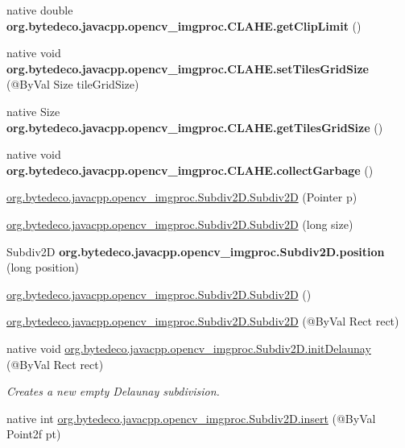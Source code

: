 \begin{DoxyCompactItemize}
native double {\bfseries org.\+bytedeco.\+javacpp.\+opencv\+\_\+imgproc.\+C\+L\+A\+H\+E.\+get\+Clip\+Limit} ()
\item 
\mbox{\label{group__imgproc_gac0c8c765edb4040e1def1ebc139de087}} 
native void {\bfseries org.\+bytedeco.\+javacpp.\+opencv\+\_\+imgproc.\+C\+L\+A\+H\+E.\+set\+Tiles\+Grid\+Size} (@By\+Val Size tile\+Grid\+Size)
\item 
\mbox{\label{group__imgproc_gae118ee734cd113613cd846a2513a7d35}} 
native Size {\bfseries org.\+bytedeco.\+javacpp.\+opencv\+\_\+imgproc.\+C\+L\+A\+H\+E.\+get\+Tiles\+Grid\+Size} ()
\item 
\mbox{\label{group__imgproc_ga5f07a495c61937e32ddabd7414000752}} 
native void {\bfseries org.\+bytedeco.\+javacpp.\+opencv\+\_\+imgproc.\+C\+L\+A\+H\+E.\+collect\+Garbage} ()
\item 
\hyperlink{group__imgproc_ga223915a9b07b19809dcae507f071bd73}{org.\+bytedeco.\+javacpp.\+opencv\+\_\+imgproc.\+Subdiv2\+D.\+Subdiv2D} (Pointer p)
\item 
\hyperlink{group__imgproc_ga3b06b65ff3cb26053cb1cea3a2dc3a0c}{org.\+bytedeco.\+javacpp.\+opencv\+\_\+imgproc.\+Subdiv2\+D.\+Subdiv2D} (long size)
\item 
\mbox{\label{group__imgproc_ga6581e20ac0802c75d91b12249f2ec7de}} 
Subdiv2D {\bfseries org.\+bytedeco.\+javacpp.\+opencv\+\_\+imgproc.\+Subdiv2\+D.\+position} (long position)
\item 
\hyperlink{group__imgproc_gae59447279a4317ac1ec79b5c0f3b8f4d}{org.\+bytedeco.\+javacpp.\+opencv\+\_\+imgproc.\+Subdiv2\+D.\+Subdiv2D} ()
\item 
\hyperlink{group__imgproc_ga07dbdb939b272f64ee69ec85f251b92d}{org.\+bytedeco.\+javacpp.\+opencv\+\_\+imgproc.\+Subdiv2\+D.\+Subdiv2D} (@By\+Val Rect rect)
\item 
native void \hyperlink{group__imgproc_gac0bcff66e719b85805c3ccbdd59759a8}{org.\+bytedeco.\+javacpp.\+opencv\+\_\+imgproc.\+Subdiv2\+D.\+init\+Delaunay} (@By\+Val Rect rect)
\begin{DoxyCompactList}\small\item\em Creates a new empty Delaunay subdivision. \end{DoxyCompactList}\item 
native int \hyperlink{group__imgproc_ga910bf3955c8f70eb87b6191941a1d509}{org.\+bytedeco.\+javacpp.\+opencv\+\_\+imgproc.\+Subdiv2\+D.\+insert} (@By\+Val Point2f pt)

\end{DoxyCompactItemize}
